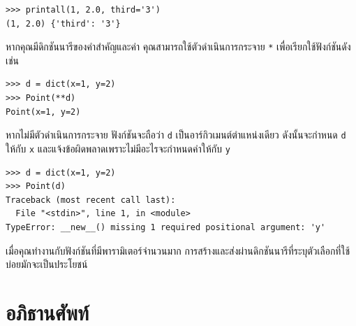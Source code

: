 \begin{verbatim}
>>> printall(1, 2.0, third='3')
(1, 2.0) {'third': '3'}
\end{verbatim}
%
หากคุณมีดิกชันนารีของคำสำคัญและค่า คุณสามารถใช้ตัวดำเนินการกระจาย {\tt **} เพื่อเรียกใช้ฟังก์ชันดังเช่น

\begin{verbatim}
>>> d = dict(x=1, y=2)
>>> Point(**d)
Point(x=1, y=2)
\end{verbatim}
%
หากไม่มีตัวดำเนินการกระจาย ฟังก์ชันจะถือว่า {\tt d} เป็นอาร์กิวเมนต์ตำแหน่งเดียว ดังนั้นจะกำหนด {\tt d} ให้กับ {\tt x} และแจ้งข้อผิดพลาดเพราะไม่มีอะไรจะกำหนดค่าให้กับ {\tt y}

\begin{verbatim}
>>> d = dict(x=1, y=2)
>>> Point(d)
Traceback (most recent call last):
  File "<stdin>", line 1, in <module>
TypeError: __new__() missing 1 required positional argument: 'y'
\end{verbatim}
%
เมื่อคุณทำงานกับฟังก์ชันที่มีพารามิเตอร์จำนวนมาก การสร้างและส่งผ่านดิกชันนารีที่ระบุตัวเลือกที่ใช้บ่อยมักจะเป็นประโยชน์


\section{อภิธานศัพท์}


